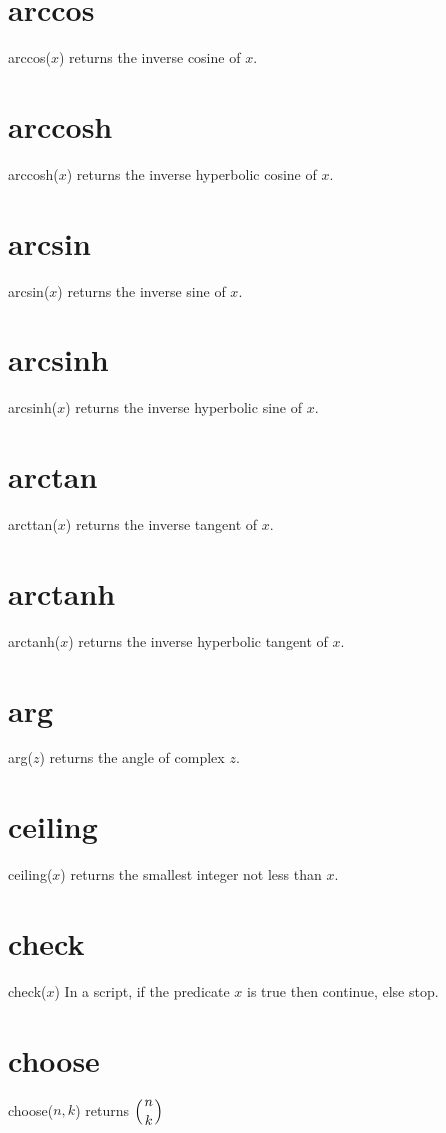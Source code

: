 \documentclass[12pt]{book}
\begin{document}
\section*{arccos}
arccos($x$) returns the inverse cosine of $x$.

\section*{arccosh}
arccosh($x$) returns the inverse hyperbolic cosine of $x$.

\section*{arcsin}
arcsin($x$) returns the inverse sine of $x$.

\section*{arcsinh}
arcsinh($x$) returns the inverse hyperbolic sine of $x$.

\section*{arctan}
arcttan($x$) returns the inverse tangent of $x$.

\section*{arctanh}
arctanh($x$) returns the inverse hyperbolic tangent of $x$.

\section*{arg}
arg($z$) returns the angle of complex $z$.

\section*{ceiling}
ceiling($x$) returns the smallest integer not less than $x$.

\section*{check}
check($x$) In a script, if the predicate $x$ is true then continue, else stop.

\section*{choose}
choose($n,k$) returns $\displaystyle\left({n \atop k}\right)$
\end{document}
